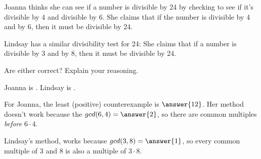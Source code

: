 \documentclass[nooutcomes]{ximera}
\begin{document}
\begin{problem}
Joanna thinks she can see if a number is divisible by 24 by
  checking to see if it's divisible by 4 and divisible by 6.  She
  claims that if the number is divisible by 4 and by 6, then it must
  be divisible by 24.

Lindsay has a similar divisibility test for 24: She claims that if a
number is divisible by 3 and by 8, then it must be divisible by 24.

Are either correct?  Explain your reasoning.

Joanna is .  
Lindsay is .  
\begin{hint}For Joanna, the least (positive) counterexample is $\answer{12}$.  Her method doesn't work because the $gcd(6,4) = \answer{2}$, so there are common multiples \emph{before} $6\cdot4$.  

Lindsay's method, works because $gcd(3,8) = \answer{1}$, so every common multiple of $3$ and $8$ is also a multiple of $3\cdot8$.  
\end{hint}
\end{problem}


\end{document}
